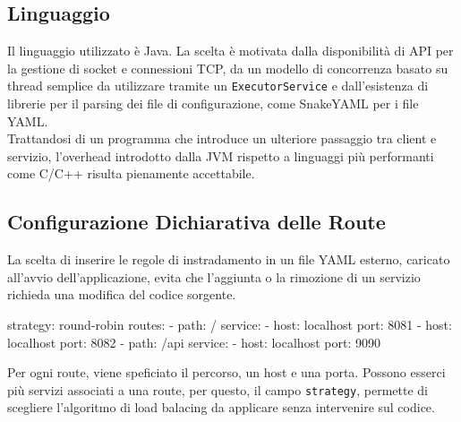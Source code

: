 \subsection{Linguaggio}
Il linguaggio utilizzato è Java. La scelta è motivata dalla disponibilità di API per la gestione di socket e connessioni TCP, da un modello di concorrenza basato su
thread semplice da utilizzare tramite un \texttt{ExecutorService} e dall'esistenza di librerie per il parsing dei file di configurazione, come SnakeYAML per i file YAML. \\
Trattandosi di un programma che introduce un ulteriore passaggio tra client e servizio, l'overhead introdotto dalla JVM rispetto a linguaggi più performanti
come C/C++ risulta pienamente accettabile.

\subsection{Configurazione Dichiarativa delle Route}
La scelta di inserire le regole di instradamento in un file YAML esterno, caricato all'avvio dell'applicazione,
evita che l'aggiunta o la rimozione di un servizio richieda una modifica del codice sorgente.

\begin{yaml}
strategy: round-robin
routes:
  - path: /
    service:
      - host: localhost
        port: 8081
      - host: localhost
        port: 8082
  - path: /api
    service:
      - host: localhost
        port: 9090
\end{yaml}

Per ogni route, viene speficiato il percorso, un host e una porta. Possono esserci più servizi associati a una route, per questo, il campo \texttt{strategy}, 
permette di scegliere l'algoritmo di load balacing da applicare senza intervenire sul codice.

